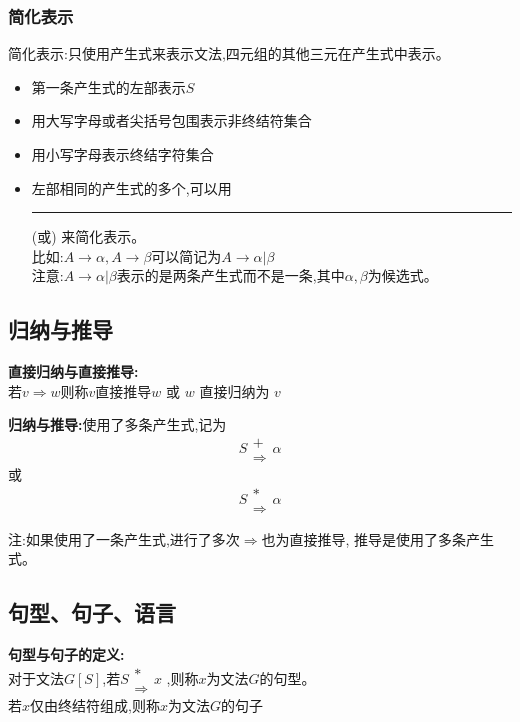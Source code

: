 \documentclass[UTF8,a4paper]{ctexart}
\newcommand\hl{\bgroup\markoverwith
  {\textcolor[rgb]{0.9, 0.99, 0.9}{\rule[-.5ex]{2pt}{2.5ex}}}\ULon}
\newcommand{\spaceline}{\vspace{\baselineskip}}
\begin{document}
      \subsubsection{简化表示}
      简化表示:只使用产生式来表示文法,四元组的其他三元在产生式中表示。
      \begin{itemize}
        \item 第一条产生式的左部表示$S$
        \item 用大写字母或者尖括号包围表示非终结符集合
        \item 用小写字母表示终结字符集合
        \item 左部相同的产生式的多个,可以用\hl{$|$}(或) 来简化表示。\\
        比如:$A\to \alpha , A \to \beta$可以简记为$A \to \alpha | \beta$\\
        注意:$A \to \alpha | \beta$表示的是两条产生式而不是一条,其中$\alpha , \beta$为候选式。
      \end{itemize}

    \subsection{归纳与推导}
    \textbf{直接归纳与直接推导:}\\
    若$v\Rightarrow w$则称$v$直接推导$w$ 或 $w$ 直接归纳为 $v$

    \spaceline

    \textbf{归纳与推导:}使用了多条产生式,记为
    \begin{equation}
      \renewcommand{\arraystretch}{0.5}
      S \begin{array}{c} + \\ \Rightarrow \end{array} \alpha
    \end{equation}
    或
    \begin{equation}
      \renewcommand{\arraystretch}{0.5}
      S \begin{array}{c} * \\ \Rightarrow \end{array} \alpha
    \end{equation}

    注:如果使用了一条产生式,进行了多次$\Rightarrow$也为直接推导, 推导是使用了多条产生式。

    \subsection{句型、句子、语言}
    \textbf{句型与句子的定义:}\\
    对于文法$G[S]$,若$\renewcommand{\arraystretch}{0.5}S \begin{array}{c} * \\ \Rightarrow \end{array} x$ ,则称$x$为文法$G$的句型。\\
    若$x$仅由终结符组成,则称$x$为文法$G$的句子
\end{document}
